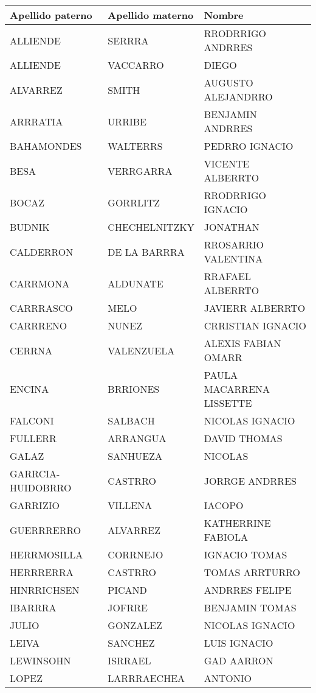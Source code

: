 \begin{table}[h]
\begin{tabular}{|l|l|l|}
\hline
Apellido paterno & Apellido materno & Nombre\\ \hline
ALLIENDE & SERRRA & RRODRRIGO ANDRRES \\ \hline
ALLIENDE & VACCARRO & DIEGO \\ \hline
ALVARREZ & SMITH & AUGUSTO ALEJANDRRO \\ \hline
ARRRATIA & URRIBE & BENJAMIN ANDRRES \\ \hline
BAHAMONDES & WALTERRS & PEDRRO IGNACIO \\ \hline
BESA & VERRGARRA & VICENTE ALBERRTO \\ \hline
BOCAZ & GORRLITZ & RRODRRIGO IGNACIO \\ \hline
BUDNIK & CHECHELNITZKY & JONATHAN \\ \hline
CALDERRON & DE LA BARRRA & RROSARRIO VALENTINA \\ \hline
CARRMONA & ALDUNATE & RRAFAEL ALBERRTO \\ \hline
CARRRASCO & MELO & JAVIERR ALBERRTO \\ \hline
CARRRENO & NUNEZ & CRRISTIAN IGNACIO \\ \hline
CERRNA & VALENZUELA & ALEXIS FABIAN OMARR \\ \hline
ENCINA & BRRIONES & PAULA MACARRENA LISSETTE \\ \hline
FALCONI & SALBACH & NICOLAS IGNACIO  \\ \hline
FULLERR & ARRANGUA & DAVID THOMAS \\ \hline
GALAZ & SANHUEZA & NICOLAS \\ \hline
GARRCIA-HUIDOBRRO & CASTRRO & JORRGE ANDRRES \\ \hline
GARRIZIO & VILLENA & IACOPO \\ \hline
GUERRRERRO & ALVARREZ & KATHERRINE FABIOLA \\ \hline
HERRMOSILLA & CORRNEJO & IGNACIO TOMAS \\ \hline
HERRRERRA & CASTRRO & TOMAS ARRTURRO \\ \hline
HINRRICHSEN & PICAND & ANDRRES FELIPE \\ \hline
IBARRRA & JOFRRE & BENJAMIN TOMAS \\ \hline
JULIO & GONZALEZ & NICOLAS IGNACIO \\ \hline
LEIVA & SANCHEZ & LUIS IGNACIO \\ \hline
LEWINSOHN & ISRRAEL & GAD AARRON \\ \hline
LOPEZ & LARRRAECHEA & ANTONIO \\ \hline

\end{tabular}
\end{table}
